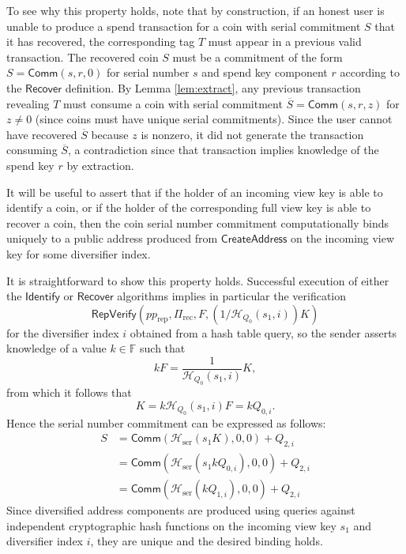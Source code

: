 \documentclass{llncs}
\newcommand{\F}{\mathbb{F}}
\newcommand{\hash}{\mathcal{H}}
\newcommand{\func}[1]{\mathsf{#1}}
\newcommand{\comm}{\func{Comm}}
\begin{document}
To see why this property holds, note that by construction, if an honest user is unable to produce a spend transaction for a coin with serial commitment $S$ that it has recovered, the corresponding tag $T$ must appear in a previous valid transaction.
The recovered coin $S$ must be a commitment of the form $S = \comm(s,r,0)$ for serial number $s$ and spend key component $r$ according to the $\func{Recover}$ definition.
By Lemma \ref{lem:extract}, any previous transaction revealing $T$ must consume a coin with serial commitment $\overline{S} = \comm(s,r,z)$ for $z \neq 0$ (since coins must have unique serial commitments).
Since the user cannot have recovered $\overline{S}$ because $z$ is nonzero, it did not generate the transaction consuming $\overline{S}$, a contradiction since that transaction implies knowledge of the spend key $r$ by extraction.

\begin{remark}
\label{rmk:janus}
It will be useful to assert that if the holder of an incoming view key is able to identify a coin, or if the holder of the corresponding full view key is able to recover a coin, then the coin serial number commitment computationally binds uniquely to a public address produced from $\func{CreateAddress}$ on the incoming view key for some diversifier index.

It is straightforward to show this property holds.
Successful execution of either the $\func{Identify}$ or $\func{Recover}$ algorithms implies in particular the verification $$\func{RepVerify}(pp_{\text{rep}},\Pi_{\text{rec}},F,(1/\hash_{Q_0}(s_1,i))K)$$ for the diversifier index $i$ obtained from a hash table query, so the sender asserts knowledge of a value $k \in \F$ such that $$kF = \frac{1}{\hash_{Q_0}(s_1,i)}K,$$ from which it follows that
$$K = k\hash_{Q_0}(s_1,i)F = kQ_{0,i}.$$
Hence the serial number commitment can be expressed as follows:
\begin{align*}
S &= \comm(\hash_{\text{ser}}(s_1 K), 0, 0) + Q_{2,i} \\
&= \comm(\hash_{\text{ser}}(s_1 kQ_{0,i}), 0, 0) + Q_{2,i} \\
&= \comm(\hash_{\text{ser}}(kQ_{1,i}), 0, 0) + Q_{2,i}
\end{align*}
Since diversified address components are produced using queries against independent cryptographic hash functions on the incoming view key $s_1$ and diversifier index $i$, they are unique and the desired binding holds.
\end{remark}
\end{document}
